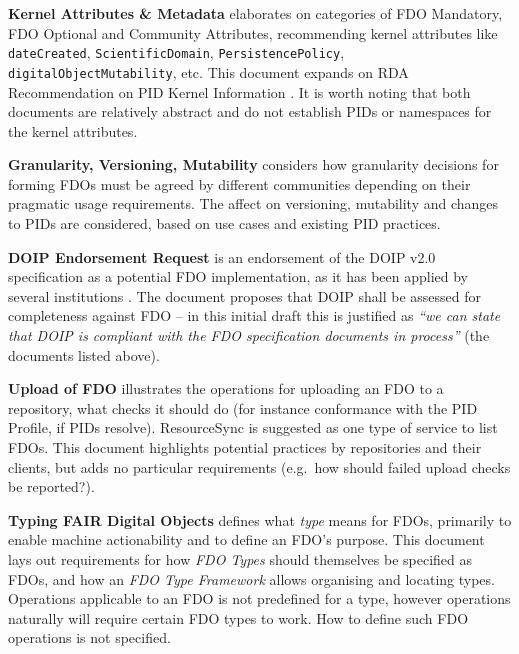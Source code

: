\textbf{Kernel Attributes \& Metadata} \cite{fdo-KernelAttributes} elaborates on categories of FDO Mandatory, FDO Optional and Community Attributes, recommending kernel attributes like \texttt{dateCreated}, \texttt{ScientificDomain}, \texttt{PersistencePolicy}, \texttt{digitalObjectMutability}, etc. This document expands on RDA Recommendation on PID Kernel Information \cite{weigelRDARecommendationPID2018}. It is worth noting that both documents are relatively abstract and do not establish PIDs or namespaces for the kernel attributes.

\textbf{Granularity, Versioning, Mutability} \cite{fdo-Granularity} considers how granularity decisions for forming FDOs must be agreed by different communities depending on their pragmatic usage requirements. The affect on versioning, mutability and changes to PIDs are considered, based on use cases and existing PID practices.

\textbf{DOIP Endorsement Request} \cite{fdo-DOIPEndorsement} is an endorsement of the DOIP v2.0 \cite{foundationDigitalObjectInterface} specification as a potential FDO implementation, as it has been applied by several institutions \cite{wittenburgFAIRDigitalObject2022b}. The document proposes that DOIP shall be assessed for completeness against FDO -- in this initial draft this is justified as \emph{``we can state that DOIP is compliant with the FDO specification documents in process''} (the documents listed above).

\textbf{Upload of FDO} \cite{fdo-FDO-Upload} illustrates the operations for uploading an FDO to a repository, what checks it should do (for instance conformance with the PID Profile, if PIDs resolve). ResourceSync \cite{ResourceSyncFrameworkSpecification} is suggested as one type of service to list FDOs. This document highlights potential practices by repositories and their clients, but adds no particular requirements (e.g.~how should failed upload checks be reported?).

\textbf{Typing FAIR Digital Objects} \cite{fdo-TypingFDOs} defines what \emph{type} means for FDOs, primarily to enable machine actionability and to define an FDO's purpose. This document lays out requirements for how \emph{FDO Types} should themselves be specified as FDOs, and how an \emph{FDO Type Framework} allows organising and locating types. Operations applicable to an FDO is not predefined for a type, however operations naturally will require certain FDO types to work. How to define such FDO operations is not specified.

